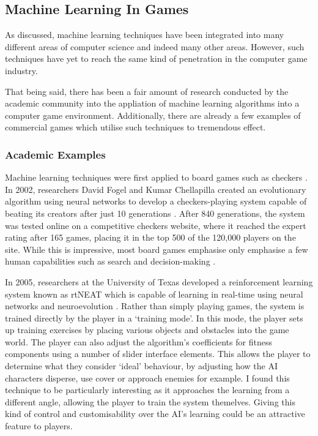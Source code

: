 \documentclass[a4paper,oneside]{report}
\begin{document}
\subsection{Machine Learning In Games}

As discussed, machine learning techniques have been integrated into many different areas of computer science and indeed many other areas. However, such techniques have yet to reach the same kind of penetration in the computer game industry.

That being said, there has been a fair amount of research conducted by the academic community into the appliation of machine learning algorithms into a computer game environment. Additionally, there are already a few examples of commercial games which utilise such techniques to tremendous effect. 

\subsubsection{Academic Examples}

Machine learning techniques were first applied to board games such as checkers \cite{Samuel:1959qo, Samuel:1967ye}. In 2002, researchers David Fogel and Kumar Chellapilla created an evolutionary algorithm using neural networks to develop a checkers-playing system capable of beating its creators after just 10 generations \cite{Fogel:2003fk}. After 840 generations, the system was tested online on a competitive checkers website, where it reached the expert rating after 165 games, placing it in the top 500 of the 120,000 players on the site. While this is impressive, most board games emphasise only emphasise a few human capabilities such as search and decision-making \cite{Laird:2001tw}. 

In 2005, researchers at the University of Texas developed a reinforcement learning system known as rtNEAT which is capable of learning in real-time using neural networks and neuroevolution \cite{Stanley:2005ff}. Rather than simply playing games, the system is trained directly by the player in a `training mode'. In this mode, the player sets up training exercises by placing various objects and obstacles into the game world. The player can also adjust the algorithm's coefficients for fitness components using a number of slider interface elements. This allows the player to determine what they consider `ideal' behaviour, by adjusting how the AI characters disperse, use cover or approach enemies for example. I found this technique to be particularly interesting as it approaches the learning from a different angle, allowing the player to train the system themelves. Giving this kind of control and customisability over the AI's learning could be an attractive feature to players. 
\end{document}
